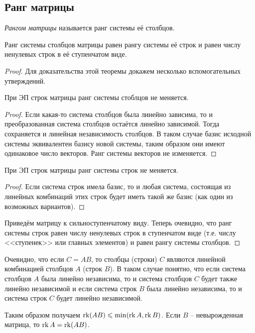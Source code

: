 \newpage
\subsection{Ранг матрицы}

\begin{df}
  \emph{Рангом матрицы} называется ранг системы её столбцов.
\end{df}

\begin{theorem}
  Ранг системы столбцов матрицы равен рангу системы её строк и равен числу ненулевых строк в её ступенчатом виде.
\end{theorem}

\begin{proof}
  Для доказательства этой теоремы докажем несколько вспомогательных утверждений.
  
  \begin{lemma}
    При ЭП строк матрицы ранг системы стоблцов не меняется.
  \end{lemma}
  \begin{proof}
    Если какая-то система столбцов была линейно зависима, то и преобразованная система столбцов остаётся линейно зависимой. Тогда сохраняется и линейная независимость столбцов. В таком случае базис исходной системы эквивалентен базису новой системы, таким образом они имеют одинаковое число векторов. Ранг системы векторов не изменяется.
  \end{proof}

  \begin{lemma}
    При ЭП строк матрицы ранг системы строк не меняется.
  \end{lemma}

  \begin{proof}
    Если система строк имела базис, то и любая система, состоящая из линейных комбинаций этих строк будет иметь такой же базис (как один из возможных вариантов).
  \end{proof}

  
  Приведём матрицу к сильноступенчатому виду. Теперь очевидно, что ранг системы строк равен числу ненулевых строк в ступенчатом виде (т.е. числу <<ступенек>> или главных элементов) и равен рангу системы столбцов.
\end{proof}

Очевидно, что если $C=AB$, то столбцы (строки) $C$ являются линейной комбинацией столбцов $A$ (строк $B$). В таком случае понятно, что если система столбцов $A$ была линейно независима, то и система столбцов $C$ будет также линейно независимой и если система строк $B$ была линейно независима, то и система строк $C$ будет линейно независимой.

Таким образом получаем $\operatorname{rk} (AB)\leqslant\min(\operatorname{rk} A, \operatorname{rk} B)$. Если $B$ -- невырожденная матрица, то $\operatorname{rk} A=\operatorname{rk} (AB)$.
